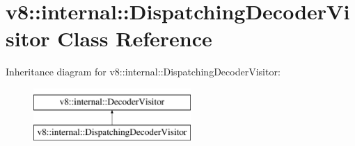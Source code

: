 \hypertarget{classv8_1_1internal_1_1DispatchingDecoderVisitor}{}\section{v8\+:\+:internal\+:\+:Dispatching\+Decoder\+Visitor Class Reference}
\label{classv8_1_1internal_1_1DispatchingDecoderVisitor}
Inheritance diagram for v8\+:\+:internal\+:\+:Dispatching\+Decoder\+Visitor\+:\begin{figure}[H]
\begin{center}
\leavevmode
\includegraphics[height=2.000000cm]{classv8_1_1internal_1_1DispatchingDecoderVisitor}
\end{center}
\end{figure}
